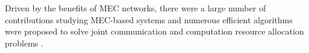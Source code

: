 \documentclass[journal]{IEEEtran}
\begin{document}
Driven by the benefits of MEC networks, there were a large number of contributions studying MEC-based systems and numerous efficient algorithms were proposed to solve joint communication and computation resource allocation problems \cite{cdma,Cao}.

\end{document}
